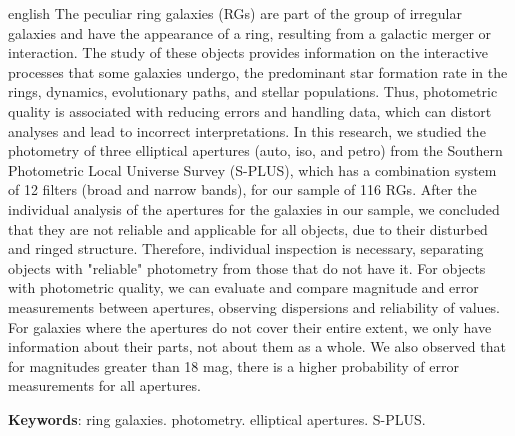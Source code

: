 \setlength{\absparsep}{18pt} %
\begin{resumo}[Abstract]
 \begin{otherlanguage*}{english}
  The peculiar ring galaxies (RGs) are part of the group of irregular galaxies and have the appearance of a ring, resulting from a galactic merger or interaction. The study of these objects provides information on the interactive processes that some galaxies undergo, the predominant star formation rate in the rings, dynamics, evolutionary paths, and stellar populations. Thus, photometric quality is associated with reducing errors and handling data, which can distort analyses and lead to incorrect interpretations. In this research, we studied the photometry of three elliptical apertures (auto, iso, and petro) from the Southern Photometric Local Universe Survey (S-PLUS), which has a combination system of 12 filters (broad and narrow bands), for our sample of 116 RGs. After the individual analysis of the apertures for the galaxies in our sample, we concluded that they are not reliable and applicable for all objects, due to their disturbed and ringed structure. Therefore, individual inspection is necessary, separating objects with "reliable" photometry from those that do not have it. For objects with photometric quality, we can evaluate and compare magnitude and error measurements between apertures, observing dispersions and reliability of values. For galaxies where the apertures do not cover their entire extent, we only have information about their parts, not about them as a whole. We also observed that for magnitudes greater than 18 mag, there is a higher probability of error measurements for all apertures.

   \vspace{\onelineskip}
 
   \noindent 
   \textbf{Keywords}: ring galaxies. photometry. elliptical apertures. S-PLUS.
 \end{otherlanguage*}
\end{resumo}